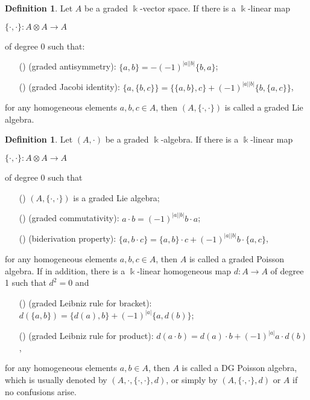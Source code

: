 \documentclass[a4paper,10pt]{amsart}
\theoremstyle{definition}
\newtheorem{defn}[theorem]{Definition}
\theoremstyle{remark}
\numberwithin{equation}{section}
\begin{document}
\begin{defn}
Let $A$ be a graded $\Bbbk$-vector space. If there is a
$\Bbbk$-linear map
\begin{center}
$\{\cdot, \cdot\}: A\otimes A\rightarrow A$
\end{center}
of degree 0 such that:

\begin{enumerate}
\item[({\romannumeral {1}})] (graded antisymmetry): $\{a, b\}=-(-1)^{|a||b|}\{b, a\}$;

\item[({\romannumeral {2}})] (graded Jacobi identity): $\{a, \{b, c\}\}=\{\{a, b\},
c\}+(-1)^{|a||b|}\{b, \{a, c\}\}$,
\end{enumerate}
for any homogeneous elements $a, b, c\in A$, then $(A, \{\cdot, \cdot\})$ is
called a graded Lie algebra.
\end{defn}

\begin{defn} \cite{LWZ}
Let $(A, \cdot)$ be a graded $\Bbbk$-algebra. If there is a
$\Bbbk$-linear map
\begin{center}
$\{\cdot, \cdot\}: A\otimes A\rightarrow A$
\end{center}
of degree 0 such that

\begin{enumerate}
\item[({\romannumeral {1}})] $(A, \{\cdot, \cdot\})$ is a graded Lie algebra;

\item[({\romannumeral {2}})] (graded commutativity): $a\cdot b=(-1)^{|a||b|}b\cdot a$;

\item[({\romannumeral {3}})] (biderivation property): $\{a, b\cdot c\}=\{a, b\}\cdot
c+(-1)^{|a||b|}b\cdot \{a, c\}$,
\end{enumerate}
for any homogeneous elements $a, b, c\in A$, then $A$ is called a
graded Poisson algebra. If in addition, there is a $\Bbbk$-linear
homogeneous map $d: A\rightarrow A$ of degree 1 such that $d^2=0$ and

\begin{enumerate}
\item[({\romannumeral {4}})] (graded Leibniz rule for bracket): $d(\{a, b\})=\{d(a),
b\}+(-1)^{|a|}\{a, d(b)\}$;

\item[({\romannumeral {5}})] (graded Leibniz rule for product): $d(a\cdot b)=d(a)\cdot
b+(-1)^{|a|}a\cdot d(b)$,
\end{enumerate}
for any homogeneous elements $a, b\in A$, then $A$ is called a DG
Poisson algebra, which is usually denoted by $(A, \cdot, \{\cdot, \cdot\},
d)$, or simply by $(A, \{\cdot, \cdot\}, d)$ or $A$ if no confusions arise.
\end{defn}
\end{document}
